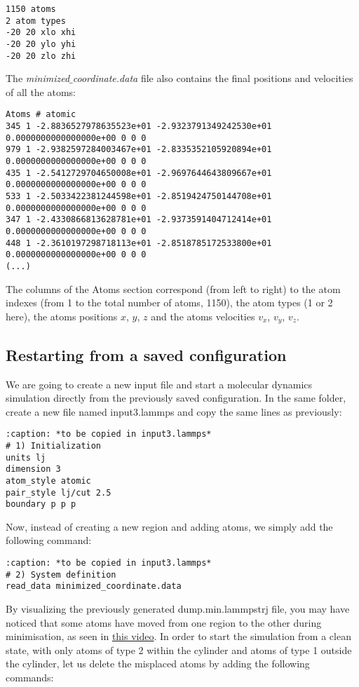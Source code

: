 \begin{verbatim}
1150 atoms
2 atom types
-20 20 xlo xhi
-20 20 ylo yhi
-20 20 zlo zhi
\end{verbatim}

\noindent The \textit{minimized$\_$coordinate.data} file also contains the final
positions and velocities of all the atoms:

\begin{verbatim}
Atoms # atomic
345 1 -2.8836527978635523e+01 -2.9323791349242530e+01 0.0000000000000000e+00 0 0 0
979 1 -2.9382597284003467e+01 -2.8335352105920894e+01 0.0000000000000000e+00 0 0 0
435 1 -2.5412729704650008e+01 -2.9697644643809667e+01 0.0000000000000000e+00 0 0 0
533 1 -2.5033422381244598e+01 -2.8519424750144708e+01 0.0000000000000000e+00 0 0 0
347 1 -2.4330866813628781e+01 -2.9373591404712414e+01 0.0000000000000000e+00 0 0 0
448 1 -2.3610197298718113e+01 -2.8518785172533800e+01 0.0000000000000000e+00 0 0 0
(...)
\end{verbatim}

\noindent The columns of the Atoms section
correspond (from left to right) to the atom indexes (from 1
to the total number of atoms, 1150), the atom types (1 or 2
here), the atoms positions $x$, $y$, $z$ and the
atoms velocities $v_x$, $v_y$, $v_z$.

\subsection{Restarting from a saved configuration}

We are going to create a new input file and start a
molecular dynamics simulation directly from the previously
saved configuration. In the same folder, create a new file
named input3.lammps and copy the same lines as previously:

\begin{verbatim}
:caption: *to be copied in input3.lammps*
# 1) Initialization
units lj
dimension 3
atom_style atomic
pair_style lj/cut 2.5
boundary p p p
\end{verbatim}

\noindent Now, instead of creating a new region and adding atoms, we
simply add the following command:

\begin{verbatim}
:caption: *to be copied in input3.lammps*
# 2) System definition
read_data minimized_coordinate.data
\end{verbatim}

\noindent By visualizing the previously generated dump.min.lammpstrj
file, you may have noticed that some atoms have moved from
one region to the other during minimisation, as seen in
\href{https://www.youtube.com/embed/gfJ_n33-F6A}{this video}.
In order to start the simulation from a clean state, with
only atoms of type 2 within the cylinder and atoms of type
1 outside the cylinder, let us delete the misplaced atoms
by adding the following commands:

